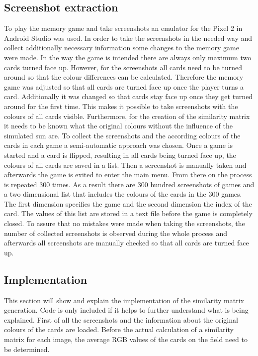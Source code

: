 \subsection{Screenshot extraction}
\label{screenshot_extraction}
To play the memory game and take screenshots an emulator for the Pixel 2 in Android Studio was used. In order to take the screenshots in the needed way and collect additionally necessary information some changes to the memory game were made. In the way the game is intended there are always only maximum two cards turned face up. However, for the screenshots all cards need to be turned around so that the colour differences can be calculated. Therefore the memory game was adjusted so that all cards are turned face up once the player turns a card. Additionally it was changed so that cards stay face up once they get turned around for the first time. This makes it possible to take screenshots with the colours of all cards visible. Furthermore, for the creation of the similarity matrix it needs to be known what the original colours without the influence of the simulated sun are. To collect the screenshots and the according colours of the cards in each game a semi-automatic approach was chosen. Once a game is started and a card is flipped, resulting in all cards being turned face up, the colours of all cards are saved in a list. Then a screenshot is manually taken and afterwards the game is exited to enter the main menu. From there on the process is repeated 300 times. As a result there are 300 hundred screenshots of games and a two dimensional list that includes the colours of the cards in the 300 games. The first dimension specifies the game and the second dimension the index of the card. The values of this list are stored in a text file before the game is completely closed. To assure that no mistakes were made when taking the screenshots, the number of collected screenshots is observed during the whole process and afterwards all screenshots are manually checked so that all cards are turned face up.

\newpage

\subsection{Implementation}
\label{implementation}
This section will show and explain the implementation of the similarity matrix generation. Code is only included if it helps to further understand what is being explained. First of all the screenshots and the information about the original colours of the cards are loaded. Before the actual calculation of a similarity matrix for each image, the average RGB values of the cards on the field need to be determined. 

